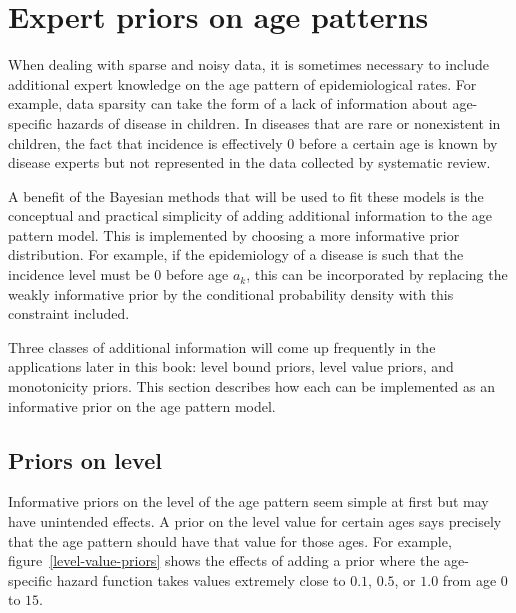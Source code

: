 \chapter{Expert priors on age patterns}
\label{theory-expert_priors}

When dealing with sparse and noisy data, it is sometimes necessary to
include additional expert knowledge on the age pattern of
epidemiological rates.  For example, data sparsity can take the form
of a lack of information about age-specific hazards of disease in children.  In
diseases that are rare or nonexistent in children, the fact that incidence is
effectively $0$ before a certain age is known by disease experts but
not represented in the data collected by systematic review.

A benefit of the Bayesian methods that will be used to fit these
models is the conceptual and practical simplicity of adding additional
information to the age pattern model.  This is implemented by choosing
a more informative prior distribution.  For example, if the
epidemiology of a disease is such that the incidence level must be
$0$ before age $a_k$, this can be incorporated by replacing the
weakly informative prior by the conditional probability density with
this constraint included.

Three classes of additional information will come up
frequently in the applications later in this book: level bound priors,
level value priors, and monotonicity priors. This section describes
how each can be implemented as an informative prior on the age pattern
model.


\section{Priors on level}

Informative priors on the level of the age pattern seem simple at
first but may have unintended effects.  A prior on the level value for
certain ages says precisely that the age pattern should have that
value for those ages.  For example, figure~\ref{level-value-priors}
shows the effects of adding a prior where the age-specific hazard function takes values extremely
close to $0.1$, $0.5$, or $1.0$ from age $0$ to $15$.


